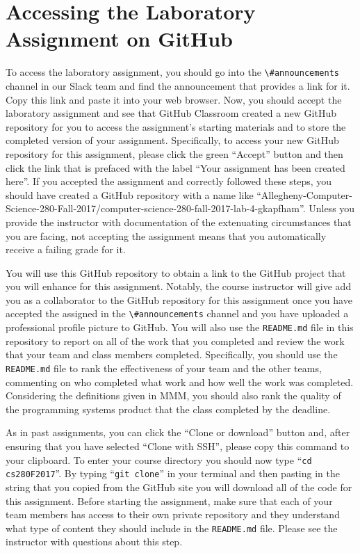 \documentclass[11pt]{article}
\newcommand{\reflection}{\lstinline{README.md}}
\newcommand{\command}[1]{``\lstinline{#1}''}
\newcommand{\channel}[1]{\lstinline{#1}}
\begin{document}
\section*{Accessing the Laboratory Assignment on GitHub}

To access the laboratory assignment, you should go into the \channel{\#announcements} channel in our Slack team and find
the announcement that provides a link for it. Copy this link and paste it into your web browser. Now, you should accept
the laboratory assignment and see that GitHub Classroom created a new GitHub repository for you to access the
assignment's starting materials and to store the completed version of your assignment. Specifically, to access your new
GitHub repository for this assignment, please click the green ``Accept'' button and then click the link that is prefaced
with the label ``Your assignment has been created here''. If you accepted the assignment and correctly followed these
steps, you should have created a GitHub repository with a name like
``Allegheny-Computer-Science-280-Fall-2017/computer-science-280-fall-2017-lab-4-gkapfham''. Unless you provide the
instructor with documentation of the extenuating circumstances that you are facing, not accepting the assignment means
that you automatically receive a failing grade for it.

You will use this GitHub repository to obtain a link to the GitHub project that you will enhance for this assignment.
Notably, the course instructor will give add you as a collaborator to the GitHub repository for this assignment once you
have accepted the assigned in the \channel{\#announcements} channel and you have uploaded a professional profile picture
to GitHub. You will also use the \reflection{} file in this repository to report on all of the work that you completed
and review the work that your team and class members completed. Specifically, you should use the \reflection{} file to
rank the effectiveness of your team and the other teams, commenting on who completed what work and how well the work was
completed. Considering the definitions given in MMM, you should also rank the quality of the programming systems product
that the class completed by the deadline.

As in past assignments, you can click the ``Clone or download'' button and, after ensuring that you have selected
``Clone with SSH'', please copy this command to your clipboard. To enter your course directory you should now type
\command{cd cs280F2017}. By typing \command{git clone} in your terminal and then pasting in the string that you copied
from the GitHub site you will download all of the code for this assignment. Before starting the assignment, make sure
that each of your team members has access to their own private repository and they understand what type of content they
should include in the \reflection{} file. Please see the instructor with questions about this step.
\end{document}
